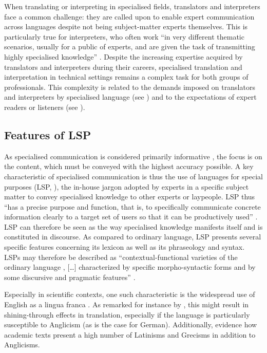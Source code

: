 When translating or interpreting in specialised fields, translators and interpreters face a common challenge: they are called upon to enable expert communication across languages despite not being subject-matter experts themselves. This is particularly true for interpreters, who often work ``in very different thematic scenarios, usually for a public of experts, and are given the task of transmitting highly specialised knowledge'' \citep[21]{rodriguez_look_2009}. Despite the increasing expertise acquired by translators and interpreters during their careers, specialised translation and interpretation in technical settings remains a complex task for both groups of professionals. This complexity is related to the demands imposed on translators and interpreters by specialised language (see ) and to the expectations of expert readers or listeners (see ).

\subsection{Features of LSP} \label{featuresLSP}
As specialised communication is considered primarily informative \citep[427]{olohan2013scientific}, the focus is on the content, which must be conveyed with the highest accuracy possible. A key characteristic of specialised communication is thus the use of languages for special purposes (LSP, \citealt{desblache2001aspects,scarpa2010traduction}), the in-house jargon \citep{kalina2006dokumentation} adopted by experts in a specific subject matter to convey specialised knowledge to other experts or laypeople. LSP thus ``has a precise purpose and function, that is, to specifically communicate concrete information clearly to a target set of users so that it can be productively used'' \citep[207]{folaron2019technology}. LSP can therefore be seen as the way specialised knowledge manifests itself and is constituted in discourse.
As compared to ordinary language, LSP presents several specific features concerning its lexicon as well as its phraseology and syntax. LSPs may therefore be described as ``contextual-functional varieties of the ordinary language \citep{garzone2006perspectives}, […] characterized by specific morpho-syntactic forms and by some discursive and pragmatic features'' \citep[134]{pignataro2012terminology}.

Especially in scientific contexts, one such characteristic is the widespread use of English as a lingua franca \citep{ammon2001dominance}. As remarked for instance by \citet{hansen2017predicting}, this might result in shining-through effects in translation, especially if the language is particularly susceptible to Anglicism (as is the case for German). Additionally, \citet{braun2014} evidence how academic texts present a high number of Latinisms and Grecisms in addition to Anglicisms.

